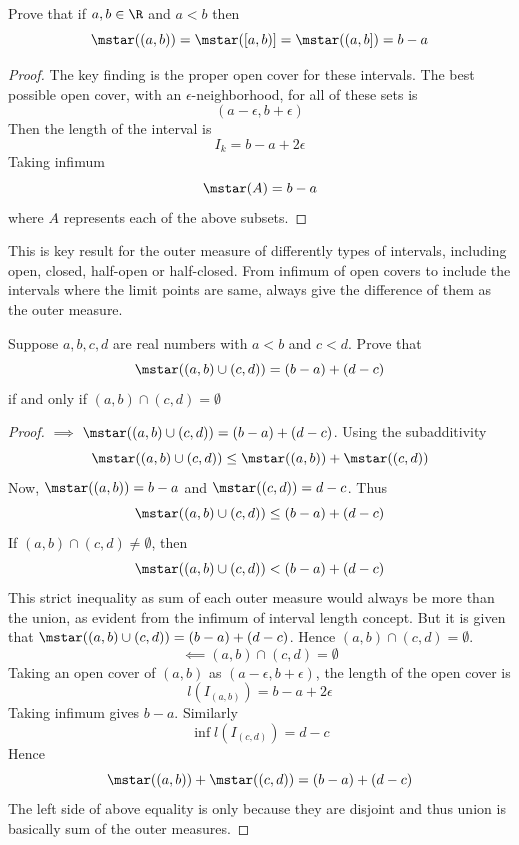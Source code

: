     \begin{exercise}
        Prove that if $a, b \in \R$ and $a<b$ then
        \[
        \mstar((a, b))=\mstar([a, b)]=\mstar((a, b])=b-a
        \]
    \end{exercise}
    \begin{proof}
        The key finding is the proper open cover for these intervals. The best possible open cover, with an $\epsilon$-neighborhood, for all of these sets is
        \[
        (a-\epsilon, b+\epsilon)
        \]
        Then the length of the interval is
        \[
        I_k=b-a+2\epsilon
        \]
        Taking infimum
        \[
        \mstar(A)= b-a
        \]
        where $A$ represents each of the above subsets. 
    \end{proof}
    \begin{takeaway}
        This is key result for the outer measure of differently types of intervals, including open, closed, half-open or half-closed. From infimum of open covers to include the intervals where the limit points are same, always give the difference of them as the outer measure. 
    \end{takeaway}
    \begin{exercise}
        Suppose $a, b, c, d$ are real numbers with $a<b$ and $c<d$. Prove that
        \[
        \mstar((a,b)\cup (c,d)) = (b-a)+(d-c) 
        \]
        if and only if $(a, b)\cap (c,d)=\emptyset$
    \end{exercise}
    \begin{proof}
        $\implies$ $\mstar((a,b)\cup (c,d)) = (b-a)+(d-c)$. Using the subadditivity
        \[
        \mstar((a,b)\cup (c,d)) \leq \mstar((a,b)) + \mstar((c,d))
        \]
        Now, $\mstar((a, b))=b-a$ and $\mstar((c, d))=d-c$. Thus
        \[
        \mstar((a,b)\cup (c,d)) \leq (b-a) + (d-c)
        \]
        If $(a, b) \cap (c, d) \neq \emptyset$, then
        \[
        \mstar((a,b)\cup (c,d)) < (b-a) + (d-c)
        \]
        This strict inequality as sum of each outer measure would always be more than the union, as evident from the infimum of interval length concept. But it is given that $\mstar((a,b)\cup (c,d)) = (b-a)+(d-c)$. Hence $(a, b) \cap (c, d) = \emptyset$.\\
        \[
        \impliedby (a, b)\cap (c, d) = \emptyset
        \]
        Taking an open cover of $(a, b)$ as $(a-\epsilon, b+\epsilon)$, the length of the open cover is
        \[
        l(I_{(a,b)})= b-a +2\epsilon
        \]
        Taking infimum gives $b-a$. Similarly
        \[
        \inf l(I_{(c,d)})=d-c
        \]
        Hence
        \[
        \mstar((a, b)) + \mstar((c, d)) = (b-a)+(d-c)
        \]
        The left side of above equality is only because they are disjoint and thus union is basically sum of the outer measures. 
    \end{proof}
